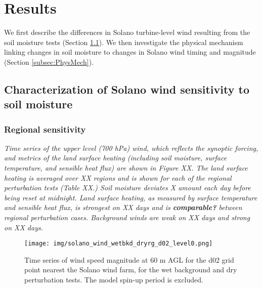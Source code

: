 
%
%
%
%
%

\section{Results}

We first describe the differences in Solano turbine-level wind resulting from the soil moisture tests (Section \ref{subsec:CharWindChanges}).  We then investigate the physical mechanism linking changes in soil moisture to changes in Solano wind timing and magnitude (Section \ref{subsec:PhysMech}).

\subsection{Characterization of Solano wind sensitivity to soil moisture}
\label{subsec:CharWindChanges}

\subsubsection{Regional sensitivity}

\textit{Time series of the upper level (700 hPa) wind, which reflects the synoptic forcing, and metrics of the land surface heating (including soil moisture, surface temperature, and sensible heat flux) are shown in Figure XX.  The land surface heating is averaged over XX regions and is shown for each of the regional perturbation tests (Table XX.)   Soil moisture deviates X amount each day before being reset at midnight.  Land surface heating, as measured by surface temperature and sensible heat flux, is strongest on XX days and is \textbf{comparable?} between regional perturbation cases.  Background winds are weak on XX days and strong on XX days.}

\begin{figure}[here]
\texttt{[image: img/solano\_wind\_wetbkd\_dryrg\_d02\_level0.png]}
\caption{Time series of wind speed magnitude at 60 m AGL for the d02 grid point nearest the Solano wind farm, for the wet background and dry perturbation tests.  The model spin-up period is excluded.}
\label{fig:windSol_TseriesDryRg}
\end{figure}

